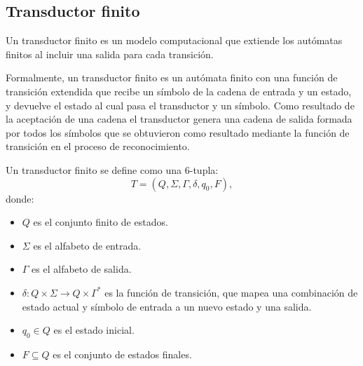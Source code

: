 \documentclass[12pt]{article}
\begin{document}
\subsection{Transductor finito}

Un transductor finito \cite{finite_transducer} es un modelo computacional que extiende 
los autómatas finitos al incluir una salida para cada transición.  

Formalmente, un transductor finito es un autómata finito con una función de transición extendida que recibe 
un símbolo de la cadena de entrada y un estado, y devuelve el estado al cual pasa el transductor y un símbolo. 
Como resultado de la aceptación de una cadena el transductor genera una cadena de salida formada por todos los 
símbolos que se obtuvieron como resultado mediante la función de transición en el proceso de reconocimiento.

Un transductor finito se define como una 6-tupla:
\[
  T = (Q, \Sigma, \Gamma, \delta, q_0, F),
\]
donde:
\begin{itemize}
  \item \(Q\) es el conjunto finito de estados.
  \item \(\Sigma\) es el alfabeto de entrada.
  \item \(\Gamma\) es el alfabeto de salida.
  \item \(\delta: Q \times \Sigma \to Q \times \Gamma^*\) es la función de transición, que mapea una combinación de estado actual y símbolo de entrada a un nuevo estado y una salida.
  \item \(q_0 \in Q\) es el estado inicial.
  \item \(F \subseteq Q\) es el conjunto de estados finales.
\end{itemize}
\end{document}
